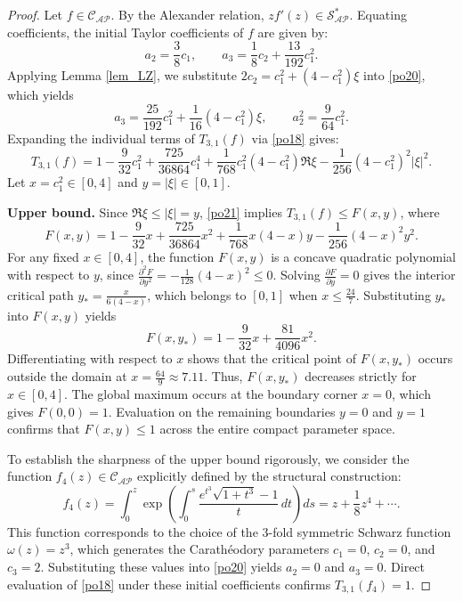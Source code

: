 \documentclass[10pt,a4paper]{amsart}
\numberwithin{equation}{section}
\begin{document}
\begin{proof}
Let $f \in \mathcal{C}_{\mathcal{AP}}$. By the Alexander relation, $zf'(z) \in \mathcal{S}_{\mathcal{AP}}^{*}$. Equating coefficients, the initial Taylor coefficients of $f$ are given by:
\begin{equation}\label{po20}
a_2 = \frac{3}{8}c_1, \qquad a_3 = \frac{1}{8}c_2 + \frac{13}{192}c_1^2.
\end{equation}
Applying Lemma \ref{lem_LZ}, we substitute $2c_2 = c_1^2+(4-c_1^2)\xi$ into \eqref{po20}, which yields
\[
a_3 = \frac{25}{192}c_1^2 + \frac{1}{16}(4-c_1^2)\xi, \qquad a_2^2 = \frac{9}{64}c_1^2.
\]
Expanding the individual terms of $T_{3,1}(f)$ via \eqref{po18} gives:
\begin{equation}\label{po21}
T_{3,1}(f) = 1 -\frac{9}{32}c_1^2 +\frac{725}{36864}c_1^4 +\frac{1}{768}c_1^2(4-c_1^2)\Re\xi -\frac{1}{256}(4-c_1^2)^2|\xi|^2.
\end{equation}
Let $x=c_1^2 \in [0,4]$ and $y=|\xi| \in [0,1]$.

\medskip
\noindent\textbf{Upper bound.}
Since $\Re\xi \le |\xi| = y$, \eqref{po21} implies $T_{3,1}(f) \le F(x,y)$, where
\[
F(x,y) = 1 -\frac{9}{32}x +\frac{725}{36864}x^2 +\frac{1}{768}x(4-x)y -\frac{1}{256}(4-x)^2y^2.
\]
For any fixed $x\in[0,4]$, the function $F(x,y)$ is a concave quadratic polynomial with respect to $y$, since $\frac{\partial^2F}{\partial y^2} = -\frac{1}{128}(4-x)^2 \le 0$. Solving $\frac{\partial F}{\partial y} = 0$ gives the interior critical path $y_* = \frac{x}{6(4-x)}$, which belongs to $[0,1]$ when $x \le \frac{24}{7}$. Substituting $y_*$ into $F(x,y)$ yields
\[
F(x,y_*) = 1 -\frac{9}{32}x +\frac{81}{4096}x^2.
\]
Differentiating with respect to $x$ shows that the critical point of $F(x,y_*)$ occurs outside the domain at $x = \frac{64}{9} \approx 7.11$. Thus, $F(x,y_*)$ decreases strictly for $x \in [0, 4]$. The global maximum occurs at the boundary corner $x=0$, which gives $F(0,0)=1$. Evaluation on the remaining boundaries $y=0$ and $y=1$ confirms that $F(x,y) \le 1$ across the entire compact parameter space.

To establish the sharpness of the upper bound rigorously, we consider the function $f_4(z) \in \mathcal{C}_{\mathcal{AP}}$ explicitly defined by the structural construction:
\begin{equation}\label{ext4}
f_4(z) = \int_0^z \exp\left( \int_0^s \frac{e^{t^3}\sqrt{1+t^3}-1}{t}\,dt \right)ds = z+\frac{1}{8}z^4+\cdots.
\end{equation}
This function corresponds to the choice of the 3-fold symmetric Schwarz function $\omega(z)=z^3$, which generates the Carath\'{e}odory parameters $c_1=0$, $c_2=0$, and $c_3=2$. Substituting these values into \eqref{po20} yields $a_2=0$ and $a_3=0$. Direct evaluation of \eqref{po18} under these initial coefficients confirms $T_{3,1}(f_4)=1$.


\end{proof}
\end{document}
